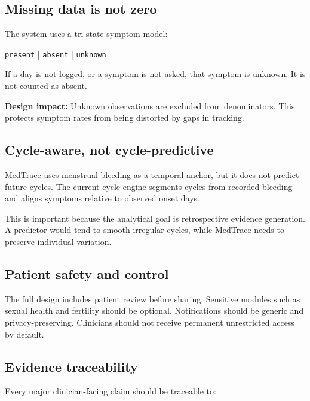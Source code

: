 \documentclass[11pt,a4paper]{article}
\begin{document}
\subsection{Missing data is not zero}

The system uses a tri-state symptom model:

\begin{center}
\texttt{present} \quad | \quad \texttt{absent} \quad | \quad \texttt{unknown}
\end{center}

If a day is not logged, or a symptom is not asked, that symptom is unknown. It is not counted as absent.

\begin{designbox}
\textbf{Design impact:} Unknown observations are excluded from denominators. This protects symptom rates from being distorted by gaps in tracking.
\end{designbox}

\subsection{Cycle-aware, not cycle-predictive}

MedTrace uses menstrual bleeding as a temporal anchor, but it does not predict future cycles. The current cycle engine segments cycles from recorded bleeding and aligns symptoms relative to observed onset days.

This is important because the analytical goal is retrospective evidence generation. A predictor would tend to smooth irregular cycles, while MedTrace needs to preserve individual variation.

\subsection{Patient safety and control}

The full design includes patient review before sharing. Sensitive modules such as sexual health and fertility should be optional. Notifications should be generic and privacy-preserving. Clinicians should not receive permanent unrestricted access by default.

\subsection{Evidence traceability}

Every major clinician-facing claim should be traceable to:
\end{document}
